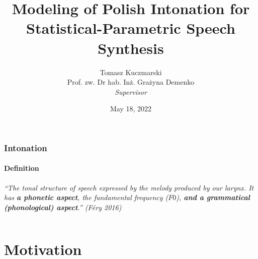 \documentclass[a4paper,9pt]{beamer}
\theoremstyle{mytheoremstyle}
\begin{document}
\title[Modeling of Polish Intonation for SPSS]{Modeling of Polish Intonation for Statistical-Parametric Speech Synthesis}
\author[Tomasz Kuczmarski]{Tomasz Kuczmarski\\
\vspace{0.5cm}
\small{Prof. zw. Dr hab. In\.z. Gra\.zyna Demenko}\\
\textit{\tiny{Supervisor}}}

\date{\tiny{May 18, 2022}}

%
\begin{frame}
\titlepage
\end{frame}




\begin{frame}
\frametitle{Intonation}
\framesubtitle{Definition}
\vspace{2cm}
\textit<1-2>{``The tonal structure of speech expressed by the melody produced by our larynx. It has \textbf{a phonetic aspect}, the fundamental frequency ($F0$), \textbf{and a grammatical (phonological) aspect}.'' (F\'ery 2016)}
\begin{columns}
\vspace{0.5cm}
\end{columns}
\end{frame}

\section{Motivation}
\end{document}
